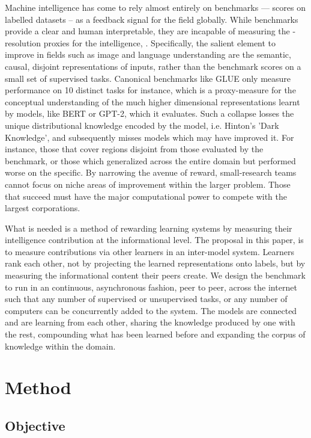 \documentclass{article}
\begin{document}
Machine intelligence has come to rely almost entirely on benchmarks --- scores on labelled datasets -- as a feedback signal for the field globally. While benchmarks provide a clear and human interpretable, they are incapable of measuring the -resolution proxies for the intelligence, .  Specifically, the salient element to improve in fields such as image and language understanding are the semantic, causal, disjoint representations of inputs, rather than the benchmark scores on a small set of supervised tasks. Canonical benchmarks like GLUE only measure performance on 10 distinct tasks for instance, which is a proxy-measure for the conceptual understanding of the much higher dimensional representations learnt by models, like BERT or GPT-2, which it evaluates. Such a collapse losses the unique distributional knowledge encoded by the model, i.e. Hinton's 'Dark Knowledge', and subsequently misses models which may have improved it. For instance, those that cover regions disjoint from those evaluated by the benchmark, or those which generalized across the entire domain but performed worse on the specific. By narrowing the avenue of reward, small-research teams cannot focus on niche areas of improvement within the larger problem. Those that succeed must have the major computational power to compete with the largest corporations. 
\smallskip

What is needed is a method of rewarding learning systems by measuring their intelligence contribution at the informational level. The proposal in this paper, is to measure contributions via other learners in an inter-model system. Learners rank each other, not by projecting the learned representations onto labels, but by measuring the informational content their peers create. We design the benchmark to run in an continuous, asynchronous fashion, peer to peer, across the internet such that any number of supervised or unsupervised tasks, or any number of computers can be concurrently added to the system. The models are connected and are learning from each other, sharing the knowledge produced by one with the rest, compounding what has been learned before and expanding the corpus of knowledge within the domain. 
\smallskip

\section{Method}

\subsection{Objective}
\end{document}

